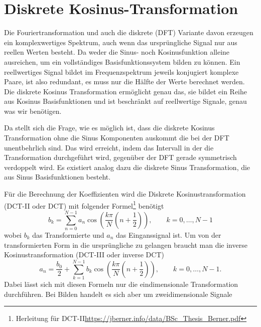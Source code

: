 %
%
%
%
\section{Diskrete Kosinus-Transformation
\label{jpeg:section:dct}}
Die Fouriertransformation und auch die diskrete (DFT) Variante davon erzeugen ein komplexwertiges Spektrum, auch wenn das ursprüngliche Signal nur aus reellen Werten besteht.
Da weder die Sinus- noch Kosinusfunktion alleine ausreichen, um ein vollständiges Basisfunktionssystem bilden zu können.
Ein reellwertiges Signal bildet im Frequenzspektrum jeweils konjugiert komplexe Paare, ist also redundant, es muss nur die Hälfte der Werte berechnet werden.
Die diskrete Kosinus Transformation ermöglicht genau das, sie bildet ein Reihe aus Kosinus Basisfunktionen und ist beschränkt auf reellwertige Signale, genau was wir benötigen.

Da stellt sich die Frage, wie es möglich ist, dass die diskrete Kosinus Transformation ohne die Sinus Komponenten auskommt die bei der DFT unentbehrlich sind.
Das wird erreicht, indem das Intervall in der die Transformation durchgeführt wird, gegenüber der DFT gerade symmetrisch verdoppelt wird.
Es existiert analog dazu die diskrete Sinus Transformation, die aus Sinus Basisfunktionen besteht.

Für die Berechnung der Koeffizienten wird die Diskrete Kosinustransformation (DCT-II oder DCT) mit folgender Formel\footnote{Herleitung für DCT-II\url{https://jberner.info/data/BSc_Thesis_Berner.pdf}} benötigt 
\begin{equation}
    b_k
    =
    \sum \limits_{n=0}^{N-1} a_n 
    \cos\left(
        \frac{k\pi}{N}\left(n + \frac{1}{2} \right) 
    \right),
    \qquad k = 0,\dots,N-1
\label{jpeg:equationdct2}
\end{equation}
wobei \(b_k\) das Transformierte und \(a_n\) das Einganssignal ist.
Um von der transformierten Form in die ursprüngliche zu gelangen braucht man die inverse Kosinustransformation (DCT-III oder inverse DCT)
\begin{equation}
    a_n
    =
    \frac{b_0}{2} +
    \sum \limits_{k=1}^{N-1} b_k 
    \cos\left(
    \frac{k\pi}{N}\left(n + \frac{1}{2} \right) 
    \right),
    \qquad k = 0,\dots,N-1.
    \label{jpeg:equationdct3}
\end{equation}
Dabei lässt sich mit diesen Formeln nur die eindimensionale Transformation durchführen.
Bei Bilden handelt es sich aber um zweidimensionale Signale

